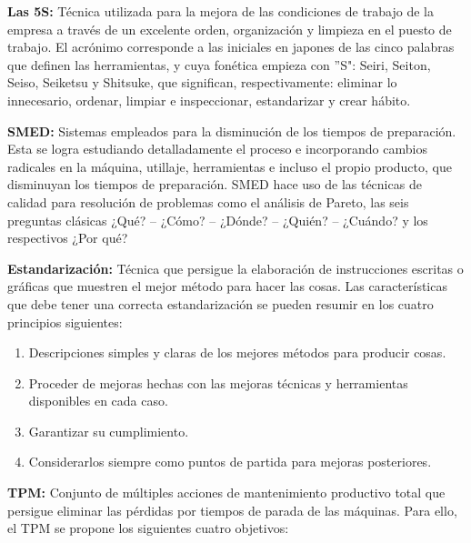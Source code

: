 \begin{description}
\item \textbf{Las 5S:} Técnica utilizada para la mejora de las condiciones de trabajo de la empresa a través de un excelente orden, organización y limpieza en el puesto de trabajo. El acrónimo corresponde a las iniciales en japones de las cinco palabras que definen las herramientas, y cuya fonética empieza con ''S": Seiri, Seiton, Seiso, Seiketsu y Shitsuke, que significan, respectivamente: eliminar lo innecesario, ordenar, limpiar e inspeccionar, estandarizar y crear hábito.

\item \textbf{SMED:} Sistemas empleados para la disminución de los tiempos de preparación. Esta se logra estudiando detalladamente el proceso e incorporando cambios radicales en la máquina, utillaje, herramientas e incluso el propio producto, que disminuyan los tiempos de preparación. SMED hace uso de las técnicas de calidad
para resolución de problemas como el análisis de Pareto, las seis preguntas clásicas ¿Qué? – ¿Cómo? – ¿Dónde? – ¿Quién? – ¿Cuándo? y los respectivos ¿Por qué? 

\item \textbf{Estandarización:} Técnica que persigue la elaboración de instrucciones escritas o gráficas que muestren el mejor método para hacer las cosas. Las características que debe tener una correcta estandarización se pueden resumir en los cuatro principios siguientes:

\begin{enumerate}
\item Descripciones simples y claras de los mejores métodos para producir cosas.
\item Proceder de mejoras hechas con las mejoras técnicas y herramientas disponibles en cada caso.
\item Garantizar su cumplimiento.
\item Considerarlos siempre como puntos de partida para mejoras posteriores.
\end{enumerate}

\item \textbf{TPM:} Conjunto de múltiples acciones de mantenimiento productivo total que persigue eliminar las pérdidas por tiempos de parada de las máquinas. Para ello, el TPM se propone los siguientes cuatro objetivos:


\end{description}
